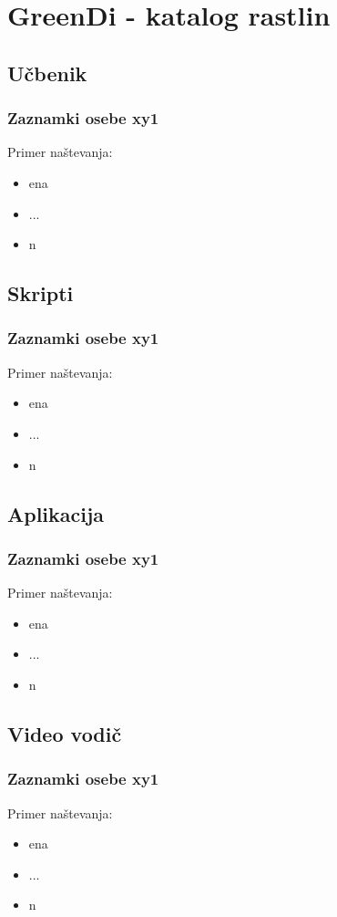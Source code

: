 \chapter{GreenDi - katalog rastlin}\label{chapSI14}

\section{Učbenik}
\subsection{Zaznamki osebe xy1}
Primer naštevanja:
\begin{itemize}
	\item ena
	\item ...
	\item n	
\end{itemize}

\section{Skripti}
\subsection{Zaznamki osebe xy1}
Primer naštevanja:
\begin{itemize}
	\item ena
	\item ...
	\item n	
\end{itemize}

\section{Aplikacija}
\subsection{Zaznamki osebe xy1}
Primer naštevanja:
\begin{itemize}
	\item ena
	\item ...
	\item n	
\end{itemize}

\section{Video vodič}
\subsection{Zaznamki osebe xy1}
Primer naštevanja:
\begin{itemize}
	\item ena
	\item ...
	\item n	
\end{itemize}